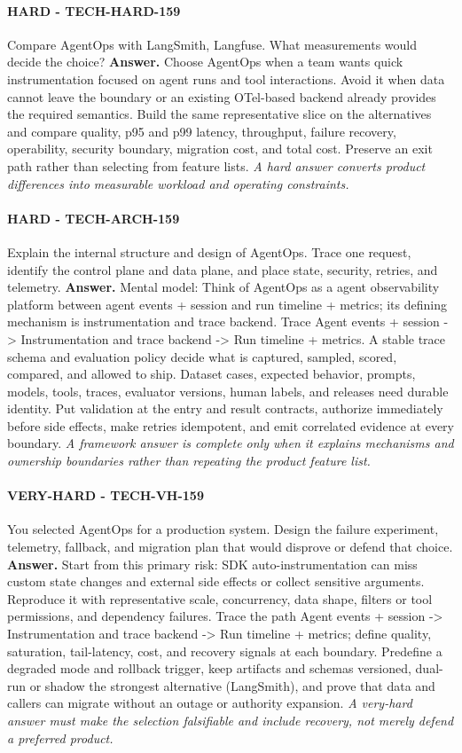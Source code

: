 \paragraph{HARD - TECH-HARD-159} Compare AgentOps with LangSmith, Langfuse. What measurements would decide the choice?
\textbf{Answer.} Choose AgentOps when a team wants quick instrumentation focused on agent runs and tool interactions. Avoid it when data cannot leave the boundary or an existing OTel-based backend already provides the required semantics. Build the same representative slice on the alternatives and compare quality, p95 and p99 latency, throughput, failure recovery, operability, security boundary, migration cost, and total cost. Preserve an exit path rather than selecting from feature lists.
\textit{A hard answer converts product differences into measurable workload and operating constraints.}
\paragraph{HARD - TECH-ARCH-159} Explain the internal structure and design of AgentOps. Trace one request, identify the control plane and data plane, and place state, security, retries, and telemetry.
\textbf{Answer.} Mental model: Think of AgentOps as a agent observability platform between agent events + session and run timeline + metrics; its defining mechanism is instrumentation and trace backend. Trace Agent events + session -> Instrumentation and trace backend -> Run timeline + metrics. A stable trace schema and evaluation policy decide what is captured, sampled, scored, compared, and allowed to ship. Dataset cases, expected behavior, prompts, models, tools, traces, evaluator versions, human labels, and releases need durable identity. Put validation at the entry and result contracts, authorize immediately before side effects, make retries idempotent, and emit correlated evidence at every boundary.
\textit{A framework answer is complete only when it explains mechanisms and ownership boundaries rather than repeating the product feature list.}
\paragraph{VERY-HARD - TECH-VH-159} You selected AgentOps for a production system. Design the failure experiment, telemetry, fallback, and migration plan that would disprove or defend that choice.
\textbf{Answer.} Start from this primary risk: SDK auto-instrumentation can miss custom state changes and external side effects or collect sensitive arguments. Reproduce it with representative scale, concurrency, data shape, filters or tool permissions, and dependency failures. Trace the path Agent events + session -> Instrumentation and trace backend -> Run timeline + metrics; define quality, saturation, tail-latency, cost, and recovery signals at each boundary. Predefine a degraded mode and rollback trigger, keep artifacts and schemas versioned, dual-run or shadow the strongest alternative (LangSmith), and prove that data and callers can migrate without an outage or authority expansion.
\textit{A very-hard answer must make the selection falsifiable and include recovery, not merely defend a preferred product.}
